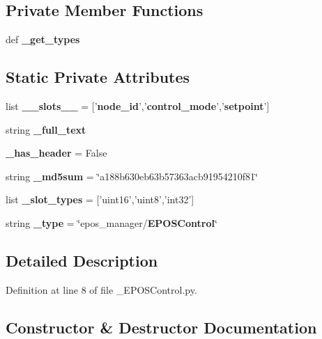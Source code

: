 \subsection*{\-Private \-Member \-Functions}
\begin{DoxyCompactItemize}
\item 
def {\bf \-\_\-get\-\_\-types}
\end{DoxyCompactItemize}
\subsection*{\-Static \-Private \-Attributes}
\begin{DoxyCompactItemize}
\item 
list {\bf \-\_\-\-\_\-slots\-\_\-\-\_\-} = ['{\bf node\-\_\-id}','{\bf control\-\_\-mode}','{\bf setpoint}']
\item 
string {\bf \-\_\-full\-\_\-text}
\item 
{\bf \-\_\-has\-\_\-header} = \-False
\item 
string {\bf \-\_\-md5sum} = \char`\"{}a188b630eb63b57363acb91954210f81\char`\"{}
\item 
list {\bf \-\_\-slot\-\_\-types} = ['uint16','uint8','int32']
\item 
string {\bf \-\_\-type} = \char`\"{}epos\-\_\-manager/{\bf \-E\-P\-O\-S\-Control}\char`\"{}
\end{DoxyCompactItemize}


\subsection{\-Detailed \-Description}


\-Definition at line 8 of file \-\_\-\-E\-P\-O\-S\-Control.\-py.



\subsection{\-Constructor \& \-Destructor \-Documentation}
